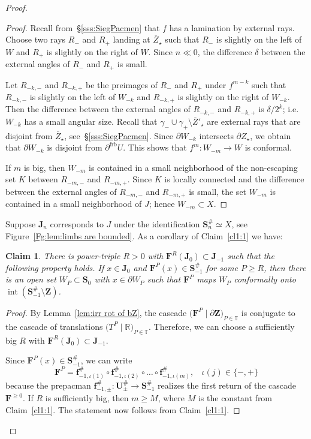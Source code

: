 \documentclass{amsart}
\renewcommand{\sp}{{\ \ }}
\newcommand{\1}{{\mathbb 1 }}
\newcommand\PT{\mathbb{ T}}
\newcommand\intr{\operatorname{int}}
\newcommand{\bF}{{\mathbf F}}
\newcommand{\bZ}{{\mathbf Z}}
\newcommand{\bJ}{{\mathbf J}}
\newcommand{\bS}{{\mathbf S}}
\newcommand{\bU}{{\mathbf U}}
\newcommand{\bbf}{{\mathbf f}}
\newcommand{\str}{{\star}}
\newcommand\frb{{\operatorname{frb}}}
\newtheorem{claim}{Claim}
\newcommand{\R}{\mathbb{R}}
\theoremstyle{remark}
\numberwithin{equation}{section}
\theoremstyle{definition}
\theoremstyle{nonumberbreak}
\begin{document}
\begin{proof}
\begin{proof}
Recall from~\S\ref{sss:SiegPacmen} that $f$ has a lamination by external rays. Choose two rays $R_-$ and $R_+$ landing at $\overline Z_\str$ such that $R_-$ is slightly on the left of $W$ and $R_+$ is slightly on the right of $W$. Since $n\ll 0$, the difference $\delta$ between the external angles of $R_-$ and $R_+$ is small. 

Let $R_{-k,-}$ and $R_{-k,+}$ be the preimages of $R_-$ and $R_+$ under $f^{m-k}$ such that $R_{-k,-}$ is slightly on the left of $W_{-k}$ and $R_{-k,+}$ is slightly on the right of $W_{-k}$. Then the difference between the external angles of $R_{-k,-}$ and $R_{-k,+}$ is $\delta/2^k$; i.e.~$W_{-k}$ has a small angular size. Recall that $\gamma_-\cup \gamma_+ \setminus \overline Z'_\str$ are external rays that are disjoint from $\overline Z_\str$, see~\S\ref{sss:SiegPacmen}. Since $\partial W_{-k}$ intersects $\partial Z_\str$, we obtain that $\partial W_{-k}$ is disjoint from  $\partial^\frb U$. This shows that $f^m\colon W_{-m}\to W$ is conformal.


If $m$ is big, then $W_{-m}$ is contained in a small neighborhood of the non-escaping set $K$ between $R_{-m,-}$ and $R_{-m,+}$. Since $K$ is locally connected and the difference between the external angles of $R_{-m,-}$ and $R_{-m,+}$ is small, the set $W_{-m}$ is contained in a small neighborhood of $J$; hence $W_{-m}\subset X$.
\end{proof}

Suppose $\bJ_n$ corresponds to $J$ under the identification $\bS_n^{\#} \simeq X$, see Figure~\ref{Fg:lem:limbs are bounded}.  As a corollary of Claim~\ref{cl1:1} we have:


\begin{claim}
\label{cl1:2}
There is power-triple $R> 0$ with $\bF^R(\bJ_0)\subset \bJ_{-1}$ such that the following property holds. If $x\in \bJ_0$ and $\bF^P(x)\in \bS_{-1}^\#$ for some $P\ge R$, then there is an open set $W_P\subset \bS_{0}$ with $x\in \partial W_P$ such that $\bF^P$ maps $ W_P$ conformally onto $\intr\left(\bS_{-1}^\#\setminus \bZ\right)$. 
\end{claim} 
\begin{proof}
By Lemma~\ref{lem:irr rot of bZ}, the cascade  $\big(\bF^P\mid  \partial \bZ\big)_{P\in \PT}$ is conjugate to the cascade of translations $\big(T^P \mid \R \big)_{P\in \PT}$. Therefore, we can choose a sufficiently big $R$ with $\bF^R(\bJ_0)\subset \bJ_{-1}$.

Since $\bF^P(x)\in \bS^\#_{-1}$, we can write 
\[\bF^P = \bbf^\#_{-1,\iota(1)}\circ\bbf^\#_{-1,\iota(2)}\circ\dots \circ \bbf^\#_{-1,\iota(m)},\sp\sp \iota(j)\in\{-,+\}\]
because the prepacman $\bbf^\#_{-1,\pm}\colon \bU^\#_\pm \to \bS^\#_{-1}$ realizes the first return of the cascade $\bF^{\ge0}$. If $R$ is sufficiently big, then $m\ge M$, where $M$ is the constant from Claim~\ref{cl1:1}. The statement now follows from Claim~\ref{cl1:1}.
\end{proof}


\end{proof}
\end{document}
